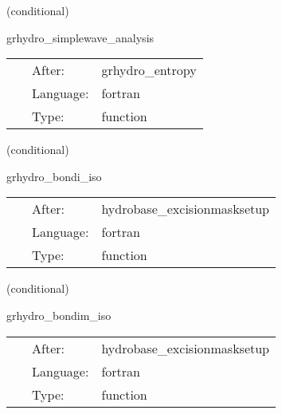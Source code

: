 \documentclass{article}
\begin{document}
\vspace{5mm}

   (conditional) 

\hspace{5mm} grhydro\_simplewave\_analysis 

\hspace{5mm}{\it compute some output variables for the simple wave } 


\hspace{5mm}

 \begin{tabular*}{160mm}{cll} 
~ & After:  & grhydro\_entropy \\ 
~ & Language:  & fortran \\ 
~ & Type:  & function \\ 
\end{tabular*} 


\vspace{5mm}

   (conditional) 

\hspace{5mm} grhydro\_bondi\_iso 

\hspace{5mm}{\it setup grhydro vars for the hydrodynamic bondi solution } 


\hspace{5mm}

 \begin{tabular*}{160mm}{cll} 
~ & After:  & hydrobase\_excisionmasksetup \\ 
~ & Language:  & fortran \\ 
~ & Type:  & function \\ 
\end{tabular*} 


\vspace{5mm}

   (conditional) 

\hspace{5mm} grhydro\_bondim\_iso 

\hspace{5mm}{\it setup grhydro vars for the magnetized bondi solution } 


\hspace{5mm}

 \begin{tabular*}{160mm}{cll} 
~ & After:  & hydrobase\_excisionmasksetup \\ 
~ & Language:  & fortran \\ 
~ & Type:  & function \\ 
\end{tabular*} 
\end{document}
